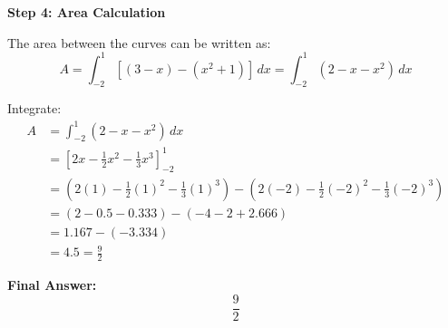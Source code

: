 \documentclass[journal,12pt,onecolumn]{IEEEtran}
\begin{document}
\textbf{Step 4: Area Calculation}

The area between the curves can be written as:
\[
A = \int_{-2}^{1} \left[ (3-x) - (x^2 + 1) \right] \, dx = \int_{-2}^{1} (2 - x - x^2)\, dx
\]

Integrate:
\begin{align*}
A &= \int_{-2}^{1} (2 - x - x^2)\,dx \\
&= \left[ 2x - \frac{1}{2}x^2 - \frac{1}{3}x^3 \right]_{-2}^{1}\\
&= \left(2(1) - \frac{1}{2}(1)^2 - \frac{1}{3}(1)^3\right) - \left(2(-2) - \frac{1}{2}(-2)^2 - \frac{1}{3}(-2)^3\right) \\
&= (2 - 0.5 - 0.333) - (-4 - 2 + 2.666) \\
&= 1.167 - (-3.334) \\
&= 4.5 = \frac{9}{2}
\end{align*}

\textbf{Final Answer:}
\[
\boxed{\frac{9}{2}}
\]
\end{document}
